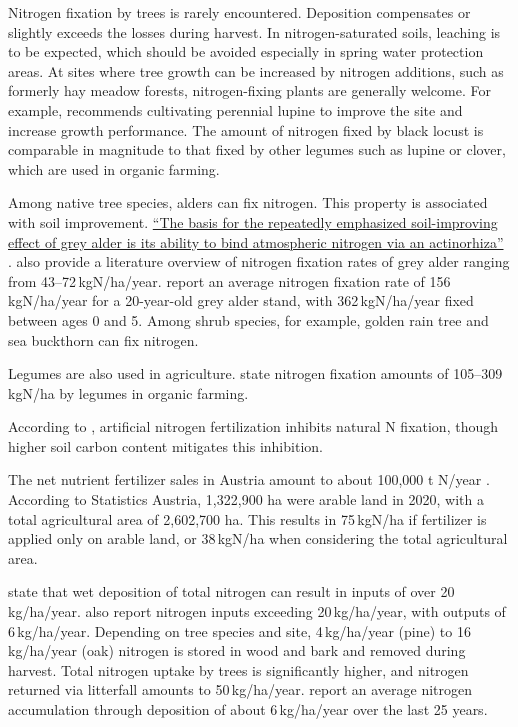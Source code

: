 Nitrogen fixation by trees is rarely encountered. Deposition compensates or slightly exceeds the losses during harvest. In nitrogen-saturated soils, leaching is to be expected, which should be avoided especially in spring water protection areas. At sites where tree growth can be increased by nitrogen additions, such as formerly hay meadow forests, nitrogen-fixing plants are generally welcome. For example, \citet{wiedemann1951ertragskunde} recommends cultivating perennial lupine to improve the site and increase growth performance. The amount of nitrogen fixed by black locust is comparable in magnitude to that fixed by other legumes such as lupine or clover, which are used in organic farming.

Among native tree species, alders can fix nitrogen. This property is associated with soil improvement. \hyperlink{german:chuett2014alnusIncarna}{\enquote{The basis for the repeatedly emphasized soil-improving effect of grey alder is its ability to bind atmospheric nitrogen via an actinorhiza}} \citep[own translation]{schuett2014alnusIncarna}.
\citet{schuett2014alnusIncarna} also provide a literature overview of nitrogen fixation rates of grey alder ranging from 43–72\,kgN/ha/year.
\citet{cleve1971grauerle} report an average nitrogen fixation rate of 156\,kgN/ha/year for a 20-year-old grey alder stand, with 362\,kgN/ha/year fixed between ages 0 and 5.
Among shrub species, for example, golden rain tree and sea buckthorn can fix nitrogen.

Legumes are also used in agriculture. \citet{kolbe2008stickstoff} state nitrogen fixation amounts of 105–309\,kgN/ha by legumes in organic farming.

According to \citet{zheng2023nFixierung}, artificial nitrogen fertilization inhibits natural N fixation, though higher soil carbon content mitigates this inhibition.

The net nutrient fertilizer sales in Austria amount to about 100,000 t N/year \citep{ama2024duengemittel}. According to Statistics Austria, 1,322,900 ha were arable land in 2020, with a total agricultural area of 2,602,700 ha. This results in 75\,kgN/ha if fertilizer is applied only on arable land, or 38\,kgN/ha when considering the total agricultural area.

\citet{uba1998deposition} state that wet deposition of total nitrogen can result in inputs of over 20\,kg/ha/year.
\citet{raspe2018stickstoff} also report nitrogen inputs exceeding 20\,kg/ha/year, with outputs of 6\,kg/ha/year. Depending on tree species and site, 4\,kg/ha/year (pine) to 16\,kg/ha/year (oak) nitrogen is stored in wood and bark and removed during harvest. Total nitrogen uptake by trees is significantly higher, and nitrogen returned via litterfall amounts to 50\,kg/ha/year.
\citet{raspe2018stickstoff} report an average nitrogen accumulation through deposition of about 6\,kg/ha/year over the last 25 years.

